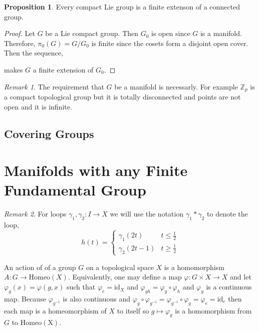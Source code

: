 \documentclass[12pt]{article}
\newcommand{\Z}{\mathbb{Z}}
\theoremstyle{remark}
\newtheorem*{remark}{Remark}
\theoremstyle{definition}
\newtheorem{proposition}[theorem]{Proposition}
\newenvironment{definition}[1][Definition:]{\begin{trivlist}
\item[\hskip \labelsep {\bfseries #1}]}{\end{trivlist}}
\begin{document}
\begin{proposition}
Every compact Lie group is a finite extenson of a connected group. 
\end{proposition}

\begin{proof}
Let $G$ be a Lie compact group. Then $G_0$ is open since $G$ is a manifold. Therefore, $\pi_0(G) = G / G_0$ is finite since the cosets form a disjoint open cover. Then the sequence,
\begin{center}
\end{center}
makes $G$ a finite extension of $G_0$. 
\end{proof}

\begin{remark}
The requirement that $G$ be a manifold is necessarly. For example $\Z_p$ is a compact topological group but it is totally disconnected and points are not open and it is infinite. 
\end{remark}

\subsection{Covering Groups}


\section{Manifolds with any Finite Fundamental Group}

\begin{remark}
For loops $\gamma_1, \gamma_2 : I \to X$ we will use the notation $\gamma_1 * \gamma_2$ to denote the loop, \[h(t) = \begin{cases} \gamma_1(2t) & t \le \frac{1}{2} \\ \gamma_2(2t - 1) & t \ge \frac{1}{2} \end{cases}\]
\end{remark}

\begin{definition}
An action of of a group $G$ on a topological space $X$ is a homomorphism $A : G \to \mathrm{Homeo}(X)$. Equivalently, one may define a map $\varphi : G \times X \to X$ and let $\varphi_g(x) = \varphi(g, x)$ such that $\varphi_e = \mathrm{id}_X$ and $\varphi_{gh} = \varphi_g \circ \varphi_h$ and $\varphi_g$ is a continuous map. Because $\varphi_{g^{-1}}$ is also continuous and $\varphi_g \circ \varphi_{g^{-1}} = \varphi_{g^{-1}} \circ \varphi_{g} = \varphi_e = \mathrm{id}_e$ then each map is a homeomorphism of $X$ to itself so $g \mapsto \varphi_g$ is a homomorphism from $G$ to $\mathrm{Homeo(X)}$.  
\end{definition}
\end{document}
